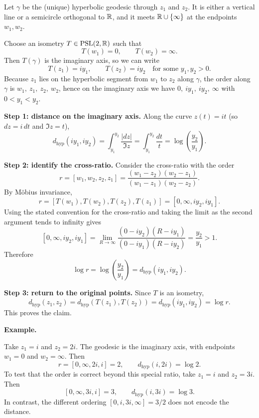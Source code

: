\begin{solution}
Let $\gamma$ be the (unique) hyperbolic geodesic through $z_1$ and $z_2$.
	It is either a vertical line or a semicircle orthogonal to $\mathbb{R}$, and it meets
	$\mathbb{R}\cup\{\infty\}$ at the endpoints $w_1,w_2$.
	
	Choose an isometry $T\in \operatorname{PSL}(2,\mathbb{R})$ such that
	\[
	T(w_1)=0,\qquad T(w_2)=\infty.
	\]
	Then $T(\gamma)$ is the imaginary axis, so we can write
	\[
	T(z_1)=i y_1,\qquad T(z_2)=i y_2
	\quad\text{for some }y_1,y_2>0.
	\]
	Because $z_1$ lies on the hyperbolic segment from $w_1$ to $z_2$ along $\gamma$,
	the order along $\gamma$ is $w_1,\ z_1,\ z_2,\ w_2$, hence on the imaginary axis
	we have $0,\ i y_1,\ i y_2,\ \infty$ with $0<y_1<y_2$.
	
	\medskip
	\noindent\textbf{Step 1: distance on the imaginary axis.}
	Along the curve $z(t)=it$ (so $dz=i\,dt$ and $\Im z=t$),
	\[
	d_{\mathrm{hyp}}(i y_1,i y_2)=\int_{y_1}^{y_2}\frac{|dz|}{\Im z}
	=\int_{y_1}^{y_2}\frac{dt}{t}
	=\log\!\left(\frac{y_2}{y_1}\right).
	\]
	
	\medskip
	\noindent\textbf{Step 2: identify the cross-ratio.}
	Consider the cross-ratio with the order
	\[
	r=[w_1,w_2,z_2,z_1]
	=\frac{(w_1-z_2)(w_2-z_1)}{(w_1-z_1)(w_2-z_2)}.
	\]
	By M\"{o}bius invariance,
	\[
	r=[T(w_1),T(w_2),T(z_2),T(z_1)]
	  =[0,\infty,i y_2,i y_1].
	\]
	Using the stated convention for the cross-ratio and taking the
	limit as the second argument tends to infinity gives
	\[
	[0,\infty,i y_2,i y_1]
	=\lim_{R\to\infty}
	  \frac{(0-i y_2)(R-i y_1)}{(0-i y_1)(R-i y_2)}
	=\frac{y_2}{y_1}>1.
	\]
	Therefore
	\[
	\log r=\log\!\left(\frac{y_2}{y_1}\right)=d_{\mathrm{hyp}}(i y_1,i y_2).
	\]
	
	\medskip
	\noindent\textbf{Step 3: return to the original points.}
	Since $T$ is an isometry,
	\[
	d_{\mathrm{hyp}}(z_1,z_2)=d_{\mathrm{hyp}}(T(z_1),T(z_2))=d_{\mathrm{hyp}}(i y_1,i y_2)=\log r.
	\]
	This proves the claim.
	
	\par\medskip\noindent\textbf{Example.}\par\smallskip

	Take $z_1=i$ and $z_2=2i$. The geodesic is the imaginary axis, with endpoints
	$w_1=0$ and $w_2=\infty$. Then
	\[
	r=[0,\infty,2i,i]=2,
	\qquad
	d_{\mathrm{hyp}}(i,2i)=\log 2.
	\]
	To test that the order is correct beyond this special ratio, take
	$z_1=i$ and $z_2=3i$. Then
	\[
	[0,\infty,3i,i]=3,
	\qquad d_{\mathrm{hyp}}(i,3i)=\log 3.
	\]
	In contrast, the different ordering
	$[0,i,3i,\infty]=3/2$ does not encode the distance.


\end{solution}
